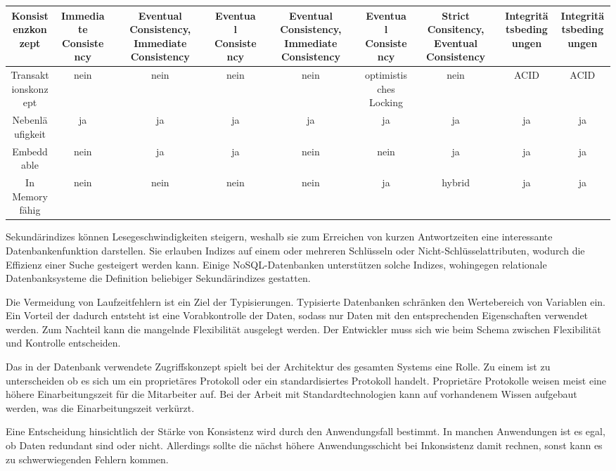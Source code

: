 \begin{table}[H]
\begin{tabulary} {\linewidth} {C | C | C | C | C | C | C | C | C}
\midrule
Konsistenzkonzept & Immediate Consistency & Eventual Consistency, Immediate Consistency & Eventual
Consistency & Eventual Consistency, Immediate Consistency & Eventual Consistency & Strict Consitency, Eventual Consistency &  Integritätsbedingungen & Integritätsbedingungen \\
\midrule
Transaktionskonzept & nein & nein & nein & nein & optimistisches Locking & nein & ACID & ACID \\
\midrule
Nebenläufigkeit & ja & ja & ja & ja & ja & ja & ja & ja \\
\midrule
Embeddable & nein & ja & ja & nein & nein & ja & ja & ja \\
\midrule
In Memory fähig & nein & nein & nein & nein & ja & hybrid & ja & ja \\
\bottomrule
\end{tabulary}
\end{table}

Sekundärindizes können Lesegeschwindigkeiten steigern, weshalb sie zum Erreichen von kurzen Antwortzeiten eine interessante Datenbankenfunktion darstellen. Sie erlauben Indizes auf einem oder mehreren Schlüsseln oder Nicht-Schlüsselattributen, wodurch die Effizienz einer Suche gesteigert werden kann. Einige NoSQL-Datenbanken unterstützen solche Indizes, wohingegen relationale Datenbanksysteme die Definition beliebiger Sekundärindizes gestatten. 

Die Vermeidung von Laufzeitfehlern ist ein Ziel der Typisierungen. Typisierte Datenbanken schränken den Wertebereich von Variablen ein. Ein Vorteil der dadurch entsteht ist eine Vorabkontrolle der Daten, sodass nur Daten mit den entsprechenden Eigenschaften verwendet werden. Zum Nachteil kann die mangelnde Flexibilität ausgelegt werden. Der Entwickler muss sich wie beim Schema zwischen Flexibilität und Kontrolle entscheiden. 

Das in der Datenbank verwendete Zugriffskonzept spielt bei der Architektur des gesamten Systems eine Rolle. Zu einem ist zu unterscheiden ob es sich um ein proprietäres Protokoll oder ein standardisiertes Protokoll handelt. Proprietäre Protokolle weisen meist eine höhere Einarbeitungszeit für die Mitarbeiter auf. Bei der Arbeit mit Standardtechnologien kann auf vorhandenem Wissen aufgebaut werden, was die Einarbeitungszeit verkürzt. 

Eine Entscheidung hinsichtlich der Stärke von Konsistenz wird durch den Anwendungsfall bestimmt. In manchen Anwendungen ist es egal, ob Daten redundant sind oder nicht. Allerdings sollte die nächst höhere Anwendungsschicht bei Inkonsistenz damit rechnen, sonst kann es zu schwerwiegenden Fehlern kommen.

